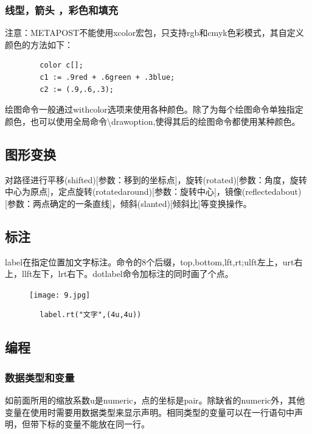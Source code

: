\documentclass[16pt]{article}
\begin{document}
    \subsubsection{线型，箭头 ，彩色和填充}
    注意：METAPOST不能使用xcolor宏包，只支持rgb和cmyk色彩模式，其自定义颜色的方法如下： \par
    \begin{lstlisting}
        color c[];
        c1 := .9red + .6green + .3blue;
        c2 := (.9,.6,.3);
    \end{lstlisting} \par
    绘图命令一般通过withcolor选项来使用各种颜色。除了为每个绘图命令单独指定颜色，也可以使用全局命令\textbackslash drawoption,使得其后的绘图命令都使用某种颜色。 \par
\subsection{图形变换}
    对路径进行平移(shifted)[参数：移到的坐标点]，旋转(rotated)[参数：角度，旋转中心为原点]，定点旋转(rotatedaround)[参数：旋转中心]，镜像(reflectedabout)[参数：两点确定的一条直线]，倾斜(slanted)[倾斜比]等变换操作。 \par

\subsection{标注}
    label在指定位置加文字标注。命令的8个后缀，top,bottom,lft,rt;ulft左上，urt右上，llft左下，lrt右下。dotlabel命令加标注的同时画了个点。\par
    \begin{figure}[htbp]
        \centering
        \texttt{[image: 9.jpg]}
    \end{figure}
    \begin{lstlisting}
        label.rt("文字",(4u,4u))
    \end{lstlisting}

\subsection{编程}
\subsubsection{数据类型和变量}
    如前面所用的缩放系数u是numeric，点的坐标是pair。除缺省的numeric外，其他变量在使用时需要用数据类型来显示声明。相同类型的变量可以在一行语句中声明，但带下标的变量不能放在同一行。 \par
\end{document}
